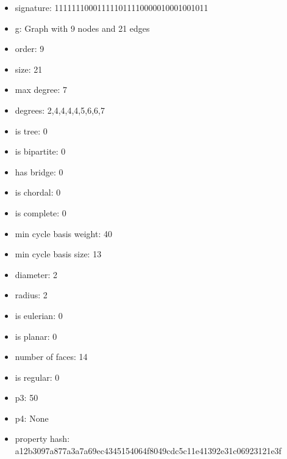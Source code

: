 \newpage
\begin{figure}
\end{figure}
\begin{itemize}
\item signature: 111111100011111011110000010001001011
\item g: Graph with 9 nodes and 21 edges
\item order: 9
\item size: 21
\item max degree: 7
\item degrees: 2,4,4,4,4,5,6,6,7
\item is tree: 0
\item is bipartite: 0
\item has bridge: 0
\item is chordal: 0
\item is complete: 0
\item min cycle basis weight: 40
\item min cycle basis size: 13
\item diameter: 2
\item radius: 2
\item is eulerian: 0
\item is planar: 0
\item number of faces: 14
\item is regular: 0
\item p3: 50
\item p4: None
\item property hash: a12b3097a877a3a7a69ec4345154064f8049cdc5c11e41392e31c06923121e3f
\end{itemize}
